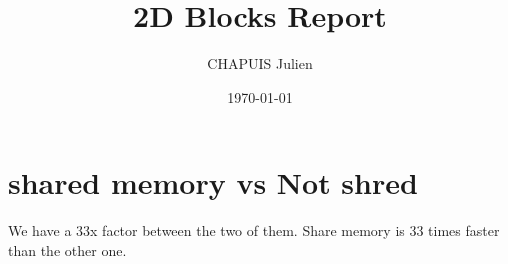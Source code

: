 \documentclass{article}
\title{2D Blocks Report}
\author{CHAPUIS Julien}
\date{\today}
\begin{document}
\section{shared memory vs Not shred}
We have a 33x factor between the two of them. Share memory is 33 times faster than the other one.
\end{document}
